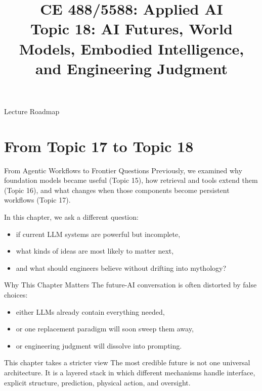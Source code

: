 \documentclass[12pt]{beamer}
\title[Topic 18: AI Futures]{CE 488/5588: Applied AI\\Topic 18: AI Futures, World Models, Embodied Intelligence, and Engineering Judgment}
\author{}
\date{}
\begin{document}
\begin{frame}
  \titlepage
\end{frame}

\begin{frame}{Lecture Roadmap}
  \tableofcontents
\end{frame}

\section{From Topic 17 to Topic 18}

\begin{frame}{From Agentic Workflows to Frontier Questions}
  Previously, we examined why foundation models became useful (Topic 15), how retrieval and tools extend them (Topic 16), and what changes when those components become persistent workflows (Topic 17).

  In this chapter, we ask a different question:
  \begin{itemize}
    \item if current LLM systems are powerful but incomplete,
    \item what kinds of ideas are most likely to matter next,
    \item and what should engineers believe without drifting into mythology?
  \end{itemize}
\end{frame}

\begin{frame}{Why This Chapter Matters}
  The future-AI conversation is often distorted by false choices:
  \begin{itemize}
    \item either LLMs already contain everything needed,
    \item or one replacement paradigm will soon sweep them away,
    \item or engineering judgment will dissolve into prompting.
  \end{itemize}

  \begin{warningbox}{This chapter takes a stricter view}
    The most credible future is not one universal architecture. It is a layered stack in which different mechanisms handle interface, explicit structure, prediction, physical action, and oversight.
  \end{warningbox}
\end{frame}
\end{document}

